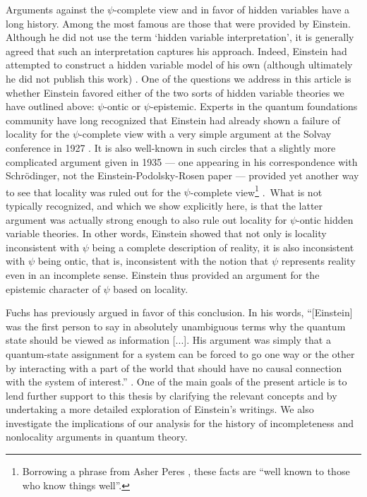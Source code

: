 \documentclass[aps,nofootinbib,12pt]{revtex4}
\begin{document}
Arguments against the $\psi$-complete view and in favor of hidden
variables have a long history. Among the most famous are those that
were provided by Einstein. Although he did not use the term `hidden
variable interpretation', it is generally agreed that such an
interpretation captures his approach. Indeed, Einstein had attempted
to construct a hidden variable model of his own (although ultimately
he did not publish this work)
\cite{Howard_eghost,bac_valentini_Epilotwave}. One of the questions
we address in this article is whether Einstein favored either of the
two sorts of hidden variable theories we have outlined above:
$\psi$-ontic or $\psi$-epistemic. Experts in the quantum foundations
community have long recognized that Einstein had already shown a
failure of locality for the $\psi$-complete view with a very simple
argument at the Solvay conference in 1927 \cite{bac_valentini}. It
is also well-known in such circles that a slightly more complicated
argument given in 1935 --- one appearing in his correspondence with
Schr\"{o}dinger, not the Einstein-Podolsky-Rosen paper --- provided
yet another way to see that locality was ruled out for the
$\psi$-complete view\footnote{Borrowing a phrase from Asher Peres
\cite{Peres_noclone}, these facts are ``well known to those who know
things well''.} \cite{Howard_einst_short,FineEcritique}.\ What is
not typically recognized, and which we show explicitly here, is that
the latter argument was actually strong enough to also rule out
locality for $\psi$-ontic hidden variable theories. In other words,
Einstein showed that not only is locality inconsistent with $\psi$
being a complete description of reality, it is also inconsistent
with $\psi$ being ontic, that is, inconsistent with the notion that
$\psi$ represents reality even in an incomplete sense. Einstein thus
provided an argument for the epistemic character of $\psi$ based on
locality.

Fuchs has previously argued in favor of this conclusion. In his
words, ``[Einstein] was the first person to say in absolutely
unambiguous terms why the quantum state should be viewed as
information [...]. His argument was simply that a quantum-state
assignment for a system can be forced to go one way or the other by
interacting with a part of the world that should have no causal
connection with the system of interest.'' \cite{Fuchs_Eepistemic}.
One of the main goals of the present article is to lend further
support to this thesis by clarifying the relevant concepts and by
undertaking a more detailed exploration of Einstein's writings. We
also investigate the implications of our analysis for the history of
incompleteness and nonlocality arguments in quantum theory.
\end{document}
